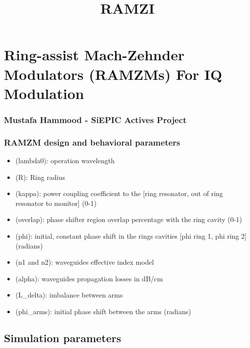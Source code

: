\documentclass[11pt]{article}
\title{RAMZI}
\providecommand{\tightlist}{%
      \setlength{\itemsep}{0pt}\setlength{\parskip}{0pt}}
\begin{document}
    
    
    \maketitle
    
    

    
    \section{Ring-assist Mach-Zehnder Modulators (RAMZMs) For IQ
Modulation}\label{ring-assist-mach-zehnder-modulators-ramzms-for-iq-modulation}

\subsubsection{Mustafa Hammood - SiEPIC Actives
Project}\label{mustafa-hammood---siepic-actives-project}

    \subsubsection{RAMZM design and behavioral
parameters}\label{ramzm-design-and-behavioral-parameters}

\begin{itemize}
\tightlist
\item
  (lambda0): operation wavelength
\item
  (R): Ring radius
\item
  (kappa): power coupling coefficient to the {[}ring resonator, out of
  ring resonator to monitor{]} (0-1)
\item
  (overlap): phase shifter region overlap percentage with the ring
  cavity (0-1)
\item
  (phi): initial, constant phase shift in the rings cavities {[}phi ring
  1, phi ring 2{]} (radians)
\item
  (n1 and n2): waveguides effective index model
\item
  (alpha): waveguides propagation losses in dB/cm
\item
  (L\_delta): imbalance between arms
\item
  (phi\_arms): initial phase shift between the arms (radians)
\end{itemize}

\subsection{Simulation parameters}\label{simulation-parameters}
\end{document}
